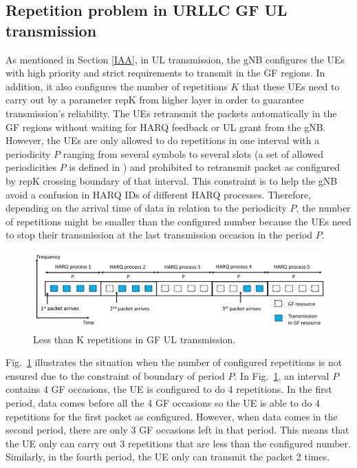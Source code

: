 \documentclass[conference]{IEEEtran}
\begin{document}
\subsection{Repetition problem in URLLC GF UL transmission}\label{IBB}
As mentioned in Section \ref{IAA}, in UL transmission, the gNB configures the UEs with high priority and strict requirements to transmit in the GF regions. In addition, it also configures the number of repetitions $K$ that these UEs need to carry out by a parameter repK from higher layer in order to guarantee transmission’s reliability. The UEs retransmit the packets automatically in the GF regions without waiting for HARQ feedback or UL grant from the gNB. However, the UEs are only allowed to do repetitions in one interval with a periodicity $P$ ranging from several symbols to several slots (a set of allowed periodicities $P$ is defined in \cite{ad5}) and prohibited to retransmit packet as configured by repK crossing boundary of that interval. This constraint is to help the gNB avoid a confusion in HARQ IDs of different HARQ processes. Therefore, depending on the arrival time of data in relation to the periodicity $P$, the number of repetitions might be smaller than the configured number because the UEs need to stop their transmission at the last transmission occasion in the period $P$.

\begin{figure}[htbp]
\centerline{\includegraphics[scale=0.27]{fig1.png}}
\caption{Less than K repetitions in GF UL transmission.}
\label{fig1}
\end{figure}

Fig.~\ref{fig1} illustrates the situation when the number of configured repetitions is not ensured due to the constraint of boundary of period $P$. In Fig.~\ref{fig1}, an interval $P$ contains 4 GF occasions, the UE is configured to do 4 repetitions. In the first period, data comes before all the 4 GF occasions so the UE is able to do 4 repetitions for the first packet as configured. However, when data comes in the second period, there are only 3 GF occasions left in that period. This means that the UE only can carry out 3 repetitions that are less than the configured number. Similarly, in the fourth period, the UE only can transmit the packet 2 times.
\end{document}
